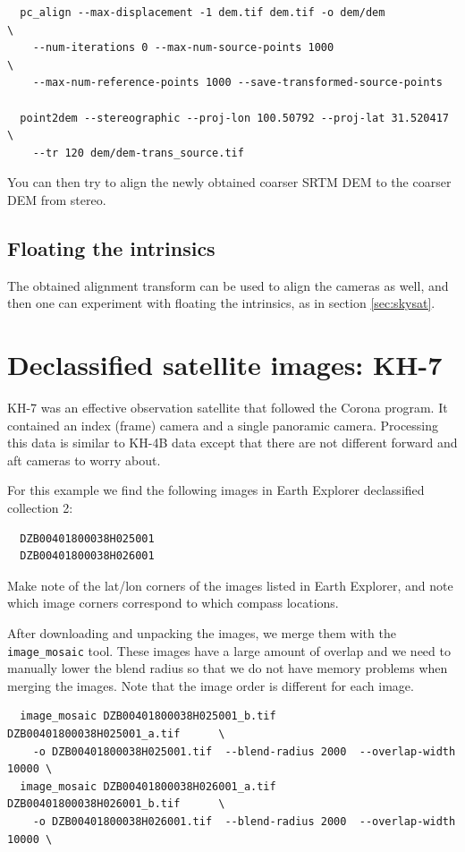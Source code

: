 \begin{verbatim}
  pc_align --max-displacement -1 dem.tif dem.tif -o dem/dem             \
    --num-iterations 0 --max-num-source-points 1000                     \
    --max-num-reference-points 1000 --save-transformed-source-points

  point2dem --stereographic --proj-lon 100.50792 --proj-lat 31.520417   \
    --tr 120 dem/dem-trans_source.tif
\end{verbatim}

You can then try to align the newly obtained coarser SRTM DEM to the 
coarser DEM from stereo. 

\subsection{Floating the intrinsics}

The obtained alignment transform can be used to align 
the cameras as well, and then one can experiment with 
floating the intrinsics, as in section \ref{sec:skysat}.

\section{Declassified satellite images: KH-7}
\label{kh7}

KH-7 was an effective observation satellite that followed the Corona program.
It contained an index (frame) camera and a single panoramic camera.  Processing
this data is similar to KH-4B data except that there are not different forward and
aft cameras to worry about.

For this example we find the following images in Earth Explorer declassified collection 2:
\begin{verbatim}
  DZB00401800038H025001
  DZB00401800038H026001
\end{verbatim}

Make note of the lat/lon corners of the images listed in Earth Explorer, and note which
image corners correspond to which compass locations.

After downloading and unpacking the images, we merge them with the \texttt{image\_mosaic} tool.
These images have a large amount of overlap and we need to manually lower the blend radius so
that we do not have memory problems when merging the images.  Note that the image order is 
different for each image.

\begin{verbatim}
  image_mosaic DZB00401800038H025001_b.tif  DZB00401800038H025001_a.tif      \
    -o DZB00401800038H025001.tif  --blend-radius 2000  --overlap-width 10000 \
  image_mosaic DZB00401800038H026001_a.tif  DZB00401800038H026001_b.tif      \
    -o DZB00401800038H026001.tif  --blend-radius 2000  --overlap-width 10000 \
\end{verbatim}

